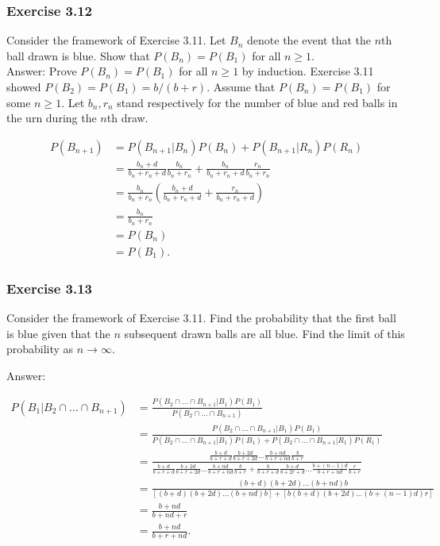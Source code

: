 \documentclass{article}
\begin{document}
{\subsubsection*{Exercise 3.12}

Consider the framework of Exercise 3.11. Let $B_n$ denote the event that the $n$th ball drawn is blue. Show that $P(B_n) = P(B_1)$ for all $n \geq 1$. \\

Answer: Prove $P(B_n) = P(B_1)$ for all $n\geq 1$ by induction. Exercise 3.11 showed $P(B_2) = P(B_1) = b/(b+r)$. Assume that $P(B_n) = P(B_1)$ for some $n \geq 1$. Let $b_n, r_n$ stand respectively for the number of blue and red balls in the urn during the $n$th draw.

\begin{align*}
P(B_{n+1}) &= P(B_{n+1} \vert B_n)P(B_n) + P(B_{n+1} \vert R_n) P(R_n) \\
&= \frac{b_n + d}{b_n + r_n + d}\frac{b_n}{b_n + r_n} + \frac{b_n}{b_n + r_n + d}\frac{r_n}{b_n + r_n} \\
&= \frac{b_n}{b_n + r_n}\left(\frac{b_n + d}{b_n +r_n + d} + \frac{r_n}{b_n +r_n + d}\right) \\
&= \frac{b_n}{b_n + r_n} \\
&= P(B_n) \\
&= P(B_1).
\end{align*}


\subsubsection*{Exercise 3.13}

Consider the framework of Exercise 3.11. Find the probability that the first ball is blue given that the $n$ subsequent drawn balls are all blue. Find
the limit of this probability as $n \rightarrow \infty$. 

Answer:

\begin{align*}
P(B_1 \vert B_2 \cap \dots \cap B_{n+1}) &= \frac{P(B_2 \cap \dots \cap B_{n+1} \vert B_1)P(B_1)}{P(B_2\cap \dots \cap B_{n+1})} \\
&= \frac{P(B_2 \cap \dots \cap B_{n+1} \vert B_1)P(B_1)}{P(B_2\cap \dots \cap B_{n+1} \vert B_1)P(B_1) + P(B_2\cap \dots \cap B_{n+1} \vert R_1)P(R_1)} \\
&= \frac{\frac{b+d}{b+r+d}\frac{b+2d}{b+r+2d} \dots \frac{b+nd}{b+r+nd}\frac{b}{b+r}}{\frac{b+d}{b+r+d}\frac{b+2d}{b+r+2d} \dots \frac{b+nd}{b+r+nd}\frac{b}{b+r} + \frac{b}{b+r+d}\frac{b+d}{b+2r+d} \dots \frac{b+(n-1)d}{b+r+nd}\frac{r}{b+r}} \\
&= \frac{(b+d)(b+2d)\dots (b + nd)b}{[(b+d)(b+2d)\dots (b + nd)b] + [b(b+d)(b+2d)\dots (b+(n-1)d)r]} \\
&= \frac{b+nd}{b+nd + r}\\
&= \frac{b+nd}{b+r + nd}.
\end{align*}

}
\end{document}
